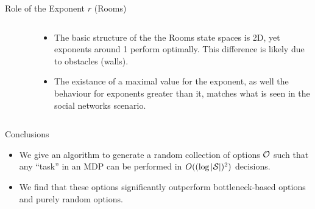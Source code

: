 \vfill
\begin{block}{Role of the Exponent $r$ (Rooms)}
    \begin{columns}
        \begin{column}{.49\textwidth}
            \begin{figure}[h]
                \centering
                \label{fig:rooms-exponent}
            \end{figure}
        \end{column}
        \begin{column}{.39\textwidth}                
            \begin{itemize}
                \item The basic structure of the the Rooms state spaces is 2D,
                    yet exponents around 1 perform optimally.  This difference
                    is likely due to obstacles (walls).
                \item The existance of a maximal value for the exponent, as well
                    the behaviour for exponents greater than it, matches what is
                    seen in the social networks scenario.
            \end{itemize}
        \end{column}
    \end{columns}
\end{block}

\vfill
\begin{block}{Conclusions}
    \begin{itemize}
        \item We give an algorithm to generate a random collection of options
            $\mathcal{O}$ such that any ``task'' in an MDP can be performed in
            $O( ( \log |\mathcal{S}| )^2 )$ decisions.
        \item We find that these options significantly outperform
            bottleneck-based options and purely random options.
    \end{itemize}
\end{block}

